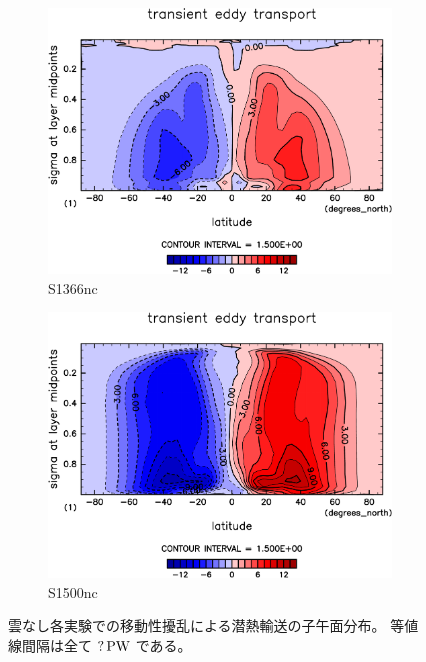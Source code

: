 \documentclass[body]{subfiles}
\begin{document}
\begin{figure}[t]
	\centering
	\begin{subfigure}{.4\textwidth}
		\centering
		\includegraphics[width=\columnwidth]{S1366-nc/MeriHeatTransTest@latentEn_TE,time=3650:4015-crop-rotate.pdf}
		\caption{S1366nc}\label{潜熱移動性擾乱S1366nc}
	\end{subfigure}
	\begin{subfigure}{.4\textwidth}
		\centering
		\includegraphics[width=\columnwidth]{S1500-nc/MeriHeatTransTest@latentEn_TE,time=3650:4015-crop-rotate.pdf}
		\caption{S1500nc}\label{潜熱移動性擾乱S1500nc}
	\end{subfigure}
	\caption[雲なし各実験での移動性擾乱による潜熱輸送の子午面分布]{
		雲なし各実験での移動性擾乱による潜熱輸送の子午面分布。
		等値線間隔は全て \(?\hmu{PW}\) である。
	}\label{潜熱移動性擾乱nc}
\end{figure}
\end{document}
